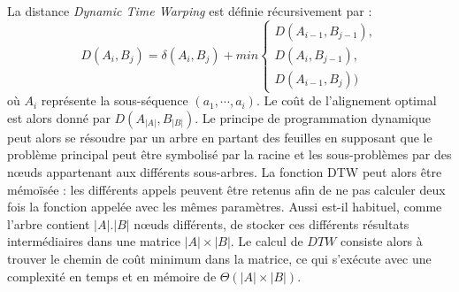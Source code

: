 La distance {\em Dynamic Time Warping} est d\'efinie r\'ecursivement par :
$$
D(A_i, B_j) = \delta(A_i,B_j) + min
				\begin{cases}
				D( A_{i-1}, B_{j-1}), \\
				D( A_{i}, B_{j-1}), \\
				D( A_{i-1}, B_{j}))
				\end{cases}
$$
o\`u $A_i$ repr\'esente la sous-s\'equence $(a_1, \cdots, a_i)$. 
Le co\^ut de l'alignement optimal est alors donn\'e par
$ D(A_{|A|}, B_{|B|})$.
Le principe de programmation dynamique peut alors se r\'esoudre par un arbre en partant des
feuilles en supposant que le probl\`eme principal peut \^etre symbolis\'e par la racine et les sous-probl\`emes par des n\oe uds appartenant aux diff\'erents sous-arbres.
La fonction DTW peut alors \^etre m\'emo\"{i}s\'ee : les diff\'erents appels peuvent \^etre retenus afin de ne pas calculer deux fois la fonction appel\'ee avec les m\^emes param\`etres. 
Aussi est-il habituel, comme l'arbre contient
$| A | . | B |$ n\oe uds diff\'erents, de stocker ces diff\'erents r\'esultats interm\'ediaires dans une matrice $|A| \times | B |$.
Le calcul de $DTW$ consiste alors \`a trouver le chemin de co\^ut minimum dans la matrice, ce qui s'ex\'ecute avec une complexit\'e en temps et en m\'emoire de $\Theta(|A| \times |B|)$.

